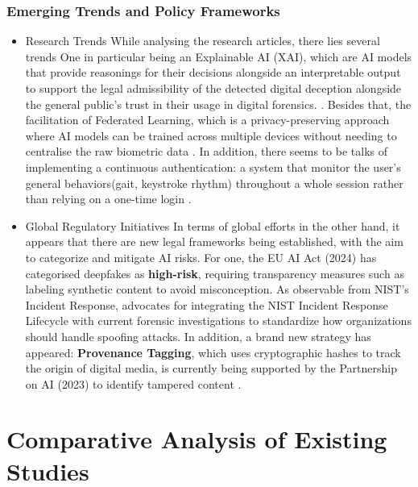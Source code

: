 \documentclass[12pt,a4paper]{article}
\begin{document}
\subsubsection{Emerging Trends and Policy Frameworks}
\begin{itemize}
\item Research Trends
While analysing the research articles, there lies several trends 
One in particular being an Explainable AI (XAI), which are AI models that provide reasonings for their decisions alongside an interpretable output to support the legal admissibility of the detected digital deception alongside the general public's trust in their usage in digital forensics. \cite{SINGH2025103632}. 
Besides that, the facilitation of Federated Learning, which is a privacy-preserving approach where AI models can be trained across multiple devices without needing to centralise the raw biometric data \cite{SINGH2025103632}. 
In addition, there seems to be talks of implementing a continuous authentication: a system that monitor the user's general behaviors(gait, keystroke rhythm) throughout a whole session rather than relying on a one-time login \cite{SINGH2025103632}.

\item Global Regulatory Initiatives
In terms of global efforts in the other hand, it appears that there are new legal frameworks being established, with the aim to categorize and mitigate AI risks. For one, the EU AI Act (2024) has categorised deepfakes as \textbf{high-risk}, requiring transparency measures such as labeling synthetic content \cite{SINGH2025103632} to avoid misconception. As observable from NIST's Incident Response, \cite{11480014} advocates for integrating the NIST Incident Response Lifecycle with current forensic investigations to standardize how organizations should handle spoofing attacks. In addition, a brand new strategy has appeared: \textbf{Provenance Tagging}, which uses cryptographic hashes to track the origin of digital media, is currently being supported by the Partnership on AI (2023) to identify tampered content \cite{SINGH2025103632}.
\end{itemize}


\section{Comparative Analysis of Existing Studies}
\end{document}
